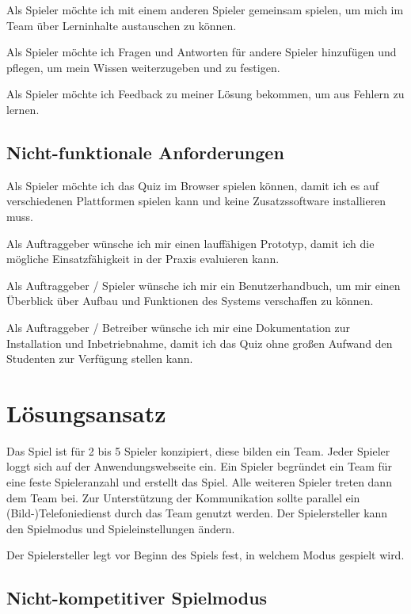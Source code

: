 \documentclass[a4paper,11pt,listof=numbered,glossary=totoc,parskip=half,toc=bib]{scrreprt}
\begin{document}
Als Spieler möchte ich mit einem anderen Spieler gemeinsam spielen, um mich im Team über Lerninhalte austauschen zu können.

Als Spieler möchte ich Fragen und Antworten für andere Spieler hinzufügen und pflegen, um mein Wissen weiterzugeben und zu festigen.

Als Spieler möchte ich Feedback zu meiner Lösung bekommen, um aus Fehlern zu lernen.


\subsection{Nicht-funktionale Anforderungen}

Als Spieler möchte ich das Quiz im Browser spielen können, damit ich es auf verschiedenen Plattformen spielen kann und keine Zusatzssoftware installieren muss.

Als Auftraggeber wünsche ich mir einen lauffähigen Prototyp, damit ich die mögliche Einsatzfähigkeit in der Praxis evaluieren kann.

Als Auftraggeber / Spieler wünsche ich mir ein Benutzerhandbuch, um mir einen Überblick über Aufbau und Funktionen des Systems verschaffen zu können.

Als Auftraggeber / Betreiber wünsche ich mir eine Dokumentation zur Installation und Inbetriebnahme, damit ich das Quiz ohne großen Aufwand den Studenten zur Verfügung stellen kann.

	\newpage
	
	\section{Lösungsansatz}

Das Spiel ist für 2 bis 5 Spieler konzipiert, diese bilden ein Team.
Jeder Spieler loggt sich auf der Anwendungswebseite ein. Ein Spieler begründet ein Team für eine feste Spieleranzahl und erstellt das Spiel. Alle weiteren Spieler treten dann dem Team bei. Zur Unterstützung der Kommunikation sollte parallel ein (Bild-)Telefoniedienst durch das Team genutzt werden. Der Spielersteller kann den Spielmodus und Spieleinstellungen ändern.

Der Spielersteller legt vor Beginn des Spiels fest, in welchem Modus gespielt wird.

\subsection{Nicht-kompetitiver Spielmodus}
\end{document}
